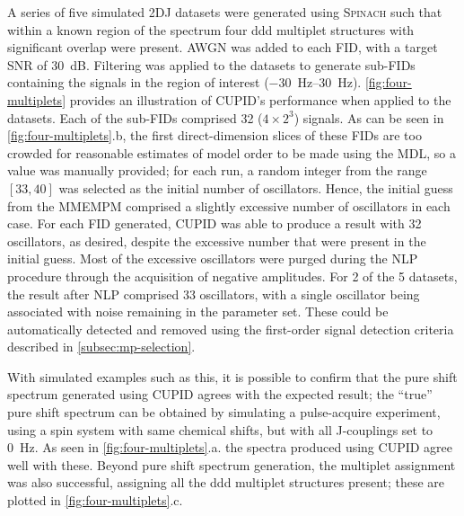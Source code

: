 A series of five simulated \ac{2DJ} datasets
were generated using \textsc{Spinach} such that within a
known region of the spectrum four ddd multiplet
structures with significant overlap were present. \ac{AWGN} was added to each
\ac{FID}, with a target \ac{SNR} of \qty{30}{\deci\bel}.
Filtering was applied to the datasets to generate sub-\acp{FID} containing the
signals in the region of interest
(\SIrange{-30}{30}{\hertz}).
\cref{fig:four-multiplets} provides an illustration of \ac{CUPID}'s performance
when applied to the datasets.
Each of the sub-\acp{FID} comprised 32 ($4 \times 2^3$) signals.
As can be seen in \cref{fig:four-multiplets}.b, the first direct-dimension
slices of these \acp{FID} are too crowded for reasonable estimates of model
order to be made using the \ac{MDL}, so a value was manually provided; for each
run, a random
integer from the range $[33, 40]$ was selected as the initial number of
oscillators. Hence, the initial guess from the \ac{MMEMPM} comprised a
slightly excessive number of oscillators in each case.
For each \ac{FID} generated, \ac{CUPID} was able to produce a
result with 32 oscillators, as desired, despite the excessive number
that were present in the initial guess. Most of the excessive oscillators were
purged during the \ac{NLP} procedure through the acquisition of negative
amplitudes.
For 2 of the 5 datasets, the result after \ac{NLP} comprised 33
oscillators, with a single oscillator being associated with noise remaining in
the parameter set. These could be
automatically detected and removed using the first-order signal detection
criteria described in \cref{subsec:mp-selection}.

With simulated examples such as this, it is possible to confirm that the pure
shift spectrum generated using \ac{CUPID} agrees with the expected result; the
``true'' pure shift spectrum can be obtained by simulating a pulse-acquire
experiment, using a spin system with same chemical shifts, but with all J-couplings
set to \qty{0}{\hertz}. As seen in \cref{fig:four-multiplets}.a. the spectra
produced using \ac{CUPID} agree well with these. Beyond pure shift spectrum
generation, the multiplet assignment was also successful, assigning all the ddd
multiplet structures present; these are plotted in \cref{fig:four-multiplets}.c.

